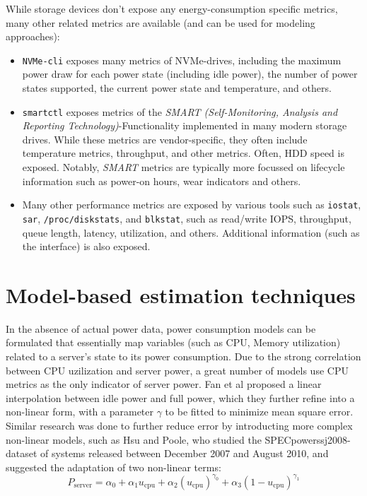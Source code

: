 While storage devices don't expose any energy-consumption specific metrics, many other related metrics are available (and can be used for modeling approaches):
\begin{itemize}
    \item \texttt{NVMe-cli}\parencite{nvmecli_github} exposes many metrics of NVMe-drives, including the maximum power draw for each power state (including idle power), the number of power states supported, the current power state and temperature, and others.
    \item \texttt{smartctl}\parencite{smartmontools_github} exposes metrics of the \textit{SMART (Self-Monitoring, Analysis and Reporting Technology)}-Functionality implemented in many modern storage drives. While these metrics are vendor-specific, they often include temperature metrics, throughput, and other metrics. Often, HDD speed is exposed. Notably, \textit{SMART} metrics are typically more focussed on lifecycle information such as power-on hours, wear indicators and others.
    \item Many other performance metrics are exposed by various tools such as \texttt{iostat}, \texttt{sar}, \texttt{/proc/diskstats}, and \texttt{blkstat}, such as read/write IOPS, throughput, queue length, latency, utilization, and others. Additional information (such as the interface) is also exposed.
\end{itemize}











\section{Model-based estimation techniques}
In the absence of actual power data, power consumption models can be formulated that essentially map variables (such as CPU, Memory utilization) related to a server's state to its power consumption. 
Due to the strong correlation between CPU uzilization and server power, a great number of models use CPU metrics as the only indicator of server power. Fan et al\parencite{fan2007power} proposed a linear interpolation between idle power and full power, which they further refine into a non-linear form, with a parameter $\gamma$ to be fitted to minimize mean square error. Similar research was done to further reduce error by introducting more complex non-linear models, such as Hsu and Poole\parencite{hsu2011power}, who studied the SPECpower\textunderscore ssj2008-dataset of systems released between December 2007 and August 2010, and suggested the adaptation of two non-linear terms:
\begin{equation}
    P_{\text{server}} = \alpha_0 + \alpha_1 u_{\text{cpu}} + \alpha_2 \left( u_{\text{cpu}} \right)^{\gamma_0} + \alpha_3 \left( 1 - u_{\text{cpu}} \right)^{\gamma_1}
\end{equation}


